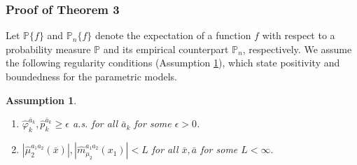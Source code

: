 \documentclass{article}
\newcommand{\wh}{\widehat}
\newcommand{\pk}{{\varphi}}
\newcommand{\pr}{\mathbb{P}}
\newtheorem{assumption}{Assumption}
\begin{document}
	
%
\subsubsection{Proof of Theorem 3}
Let $\pr\{f\}$ and $\pr_n\{f\}$ denote the expectation of a function $f$ with respect to a probability measure $\pr$ and its empirical counterpart $\pr_n$, respectively. 
We assume the following regularity conditions (Assumption \ref{A9}), which state positivity and boundedness for the parametric models.
\begin{assumption} \ \label{A9}
	\begin{enumerate}
		\item [(i)] $\wh{\pk}_k^{\bar a_k}, \wh p_k^{\bar a_k} \ge \epsilon$ a.s. for all $\bar a_k$ for some $\epsilon > 0$.
		\item [(ii)] $|\wh\mu_2^{a_1a_2}(\bar x)|, |\wh m_{\mu_2}^{a_1a_2}(x_1)| < L$ for all $\bar x, \bar a$ for some $L<\infty.$
	\end{enumerate}
\end{assumption}
\end{document}
